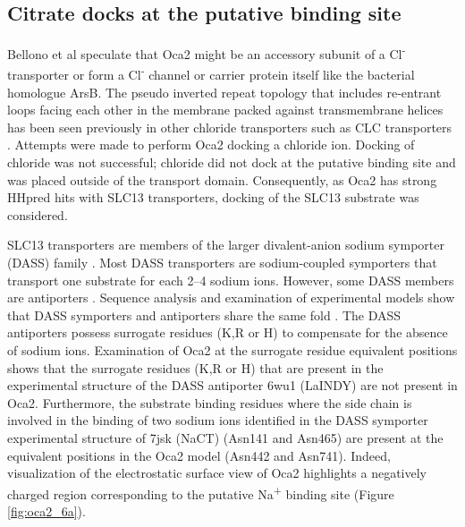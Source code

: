 \subsection{Citrate docks at the putative binding site}
Bellono et al speculate that Oca2 might be an accessory subunit of a Cl\textsuperscript{-}  transporter or form a Cl\textsuperscript{-} channel or carrier protein itself like the bacterial homologue ArsB. The pseudo inverted repeat topology that includes re-entrant loops facing each other in the membrane packed against transmembrane helices has been seen previously in other chloride transporters such as CLC transporters \cite{Feng2010,mesdaghi2020silico}.  Attempts were made to perform Oca2 docking a chloride ion.  Docking of chloride was not successful; chloride did not dock at the putative binding site and was placed outside of the transport domain.  Consequently, as Oca2 has strong HHpred hits with SLC13 transporters, docking of the SLC13 substrate was considered.

SLC13 transporters are members of the larger divalent-anion sodium symporter (DASS) family \cite{bergeron2013slc13,markovich2004slc13,pajor2014sodium,prakash2003ion}. Most DASS transporters are sodium-coupled symporters that transport one substrate for each 2–4 sodium ions. However, some DASS members are antiporters \cite{pos1998escherichia}. Sequence analysis and examination of experimental models show that DASS symporters and antiporters share the same fold \cite{lolkema1998hydropathy}.  The DASS antiporters possess surrogate residues (K,R or H) to compensate for the absence of sodium ions.  Examination of Oca2 at the surrogate residue equivalent positions shows that the surrogate residues (K,R or H) that are present in the experimental structure of the DASS antiporter 6wu1 (LaINDY) are not present in Oca2. Furthermore, the substrate binding residues where the side chain is involved in the binding of two sodium ions identified in the DASS symporter experimental structure of 7jsk (NaCT) (Asn141 and Asn465) are present at the equivalent positions in the Oca2 model (Asn442 and Asn741).  Indeed, visualization of the electrostatic surface view of Oca2 highlights a negatively charged region corresponding to the putative Na\textsuperscript{+} binding site (Figure \ref{fig:oca2_6a}).



